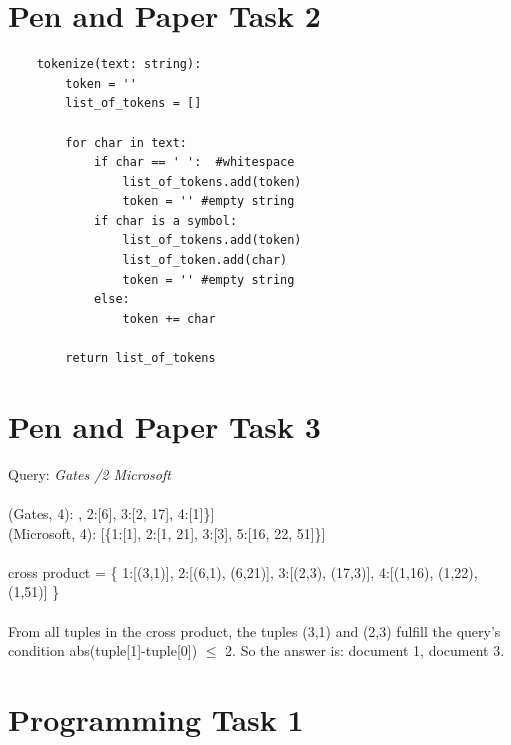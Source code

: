 \documentclass[a4paper]{scrartcl}
\begin{document}
\clearpage
\section*{Pen and Paper Task 2}
\begin{lstlisting}
    tokenize(text: string):
        token = ''
        list_of_tokens = []

        for char in text:
            if char == ' ':  #whitespace
                list_of_tokens.add(token)
                token = '' #empty string
            if char is a symbol:
                list_of_tokens.add(token)
                list_of_token.add(char)
                token = '' #empty string
            else:
                token += char
                
        return list_of_tokens

\end{lstlisting}

\clearpage
\section*{Pen and Paper Task 3}
Query: \textit{Gates /2 Microsoft}\\
\\
(Gates, 4): \quad \; [\{1:[3], 2:[6], 3:[2, 17], 4:[1]\}]\\
(Microsoft, 4): [\{1:[1], 2:[1, 21], 3:[3], 5:[16, 22, 51]\}]\\
\\
cross product = \{
  1:[(3,1)],
  2:[(6,1), (6,21)],
  3:[(2,3), (17,3)],
  4:[(1,16), (1,22), (1,51)]
\}\\
\\
From all tuples in the cross product, the tuples (3,1) and (2,3) fulfill the query's condition abs(tuple[1]-tuple[0]) $\leq$ 2. So the answer is: document 1, document 3.\\


\clearpage
\section*{Programming Task 1}

\end{document}
